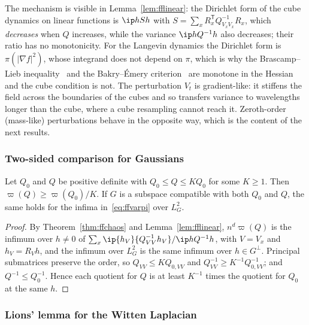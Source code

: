 The mechanism is visible in Lemma~\ref{lem:fflinear}: the Dirichlet form of
the cube dynamics on linear functions is $\ip h{Sh}$ with $S=\sum_xR_x^{\mathsf
T}Q_{V_xV_x}^{-1}R_x$, which \emph{decreases} when $Q$ increases, while the
variance $\ip h{Q^{-1}h}$ also decreases; their ratio has no monotonicity.
For the Langevin dynamics the Dirichlet form is $\pi(\lvert\nabla f\rvert^2)$,
whose integrand does not depend on $\pi$, which is why the Brascamp--Lieb
inequality~\cite{BL76} and the Bakry--\'Emery criterion~\cite{BE85} are
monotone in the Hessian and the cube condition is not. The perturbation $V_t$
is gradient-like: it stiffens the field across the boundaries of the cubes
and so transfers variance to wavelengths longer than the cube, where a cube
resampling cannot reach it. Zeroth-order (mass-like) perturbations behave in
the opposite way, which is the content of the next results.

\subsubsection{Two-sided comparison for Gaussians}

\begin{theorem}\label{thm:rSgausscomp}
Let $Q_0$ and $Q$ be positive definite with $Q_0\le Q\le KQ_0$ for some
$K\ge1$. Then $\varpi(Q)\ge\varpi(Q_0)/K$. If $G$ is a subspace compatible
with both $Q_0$ and $Q$, the same holds for the infima in~\eqref{eq:ffvarpi}
over $L^2_G$.
\end{theorem}

\begin{proof}
By Theorem~\ref{thm:ffchaos} and Lemma~\ref{lem:fflinear}, $n^d\varpi(Q)$ is
the infimum over $h\ne0$ of $\sum_x\ip{h_V}{Q_{VV}^{-1}h_V}/\ip h{Q^{-1}h}$,
with $V=V_x$ and $h_V=R_Vh$, and the infimum over $L^2_G$ is the same infimum
over $h\in G^\perp$. Principal submatrices preserve the order, so $Q_{VV}
\le KQ_{0,VV}$ and $Q_{VV}^{-1}\ge K^{-1}Q_{0,VV}^{-1}$; and $Q^{-1}\le
Q_0^{-1}$. Hence each quotient for $Q$ is at least $K^{-1}$ times the
quotient for $Q_0$ at the same $h$.
\end{proof}

\subsubsection{Lions' lemma for the Witten Laplacian}


